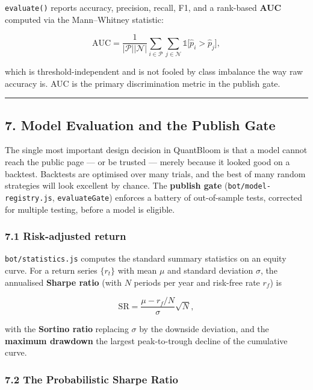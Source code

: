 \documentclass[
  11pt,
]{article}
\begin{document}
\texttt{evaluate()} reports accuracy, precision, recall, F1, and a
rank-based \textbf{AUC} computed via the Mann--Whitney statistic:

\[
\text{AUC} = \frac{1}{|\mathcal{P}||\mathcal{N}|}\sum_{i\in\mathcal{P}}\sum_{j\in\mathcal{N}}\mathbb{1}\big[\hat p_i > \hat p_j\big],
\]

which is threshold-independent and is not fooled by class imbalance the
way raw accuracy is. AUC is the primary discrimination metric in the
publish gate.

\begin{center}\rule{0.5\linewidth}{0.5pt}\end{center}

\subsection{7. Model Evaluation and the Publish
Gate}\label{model-evaluation-and-the-publish-gate}

The single most important design decision in QuantBloom is that a model
cannot reach the public page --- or be trusted --- merely because it
looked good on a backtest. Backtests are optimised over many trials, and
the best of many random strategies will look excellent by chance. The
\textbf{publish gate} (\texttt{bot/model-registry.js},
\texttt{evaluateGate}) enforces a battery of out-of-sample tests,
corrected for multiple testing, before a model is eligible.

\subsubsection{7.1 Risk-adjusted return}\label{risk-adjusted-return}

\texttt{bot/statistics.js} computes the standard summary statistics on
an equity curve. For a return series \(\{r_t\}\) with mean \(\mu\) and
standard deviation \(\sigma\), the annualised \textbf{Sharpe ratio}
(with \(N\) periods per year and risk-free rate \(r_f\)) is

\[
\text{SR} = \frac{\mu - r_f/N}{\sigma}\sqrt{N},
\]

with the \textbf{Sortino ratio} replacing \(\sigma\) by the downside
deviation, and the \textbf{maximum drawdown} the largest peak-to-trough
decline of the cumulative curve.

\subsubsection{7.2 The Probabilistic Sharpe
Ratio}\label{the-probabilistic-sharpe-ratio}
\end{document}
